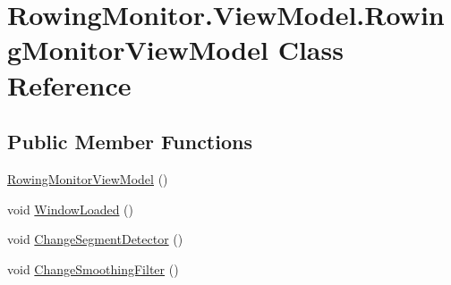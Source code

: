 \hypertarget{class_rowing_monitor_1_1_view_model_1_1_rowing_monitor_view_model}{}\section{Rowing\+Monitor.\+View\+Model.\+Rowing\+Monitor\+View\+Model Class Reference}
\label{class_rowing_monitor_1_1_view_model_1_1_rowing_monitor_view_model}
\subsection*{Public Member Functions}
\begin{DoxyCompactItemize}
\item 
\hyperlink{class_rowing_monitor_1_1_view_model_1_1_rowing_monitor_view_model_aa0e18e83c39213b03349863966548e7c}{Rowing\+Monitor\+View\+Model} ()
\item 
void \hyperlink{class_rowing_monitor_1_1_view_model_1_1_rowing_monitor_view_model_aeae6b5826078c5ef7047829af060a02a}{Window\+Loaded} ()
\item 
void \hyperlink{class_rowing_monitor_1_1_view_model_1_1_rowing_monitor_view_model_ad3e63c6b86a4c91814a1002d846a03de}{Change\+Segment\+Detector} ()
\item 
void \hyperlink{class_rowing_monitor_1_1_view_model_1_1_rowing_monitor_view_model_a98614262d0670616e2c7587769649da1}{Change\+Smoothing\+Filter} ()
\end{DoxyCompactItemize}
